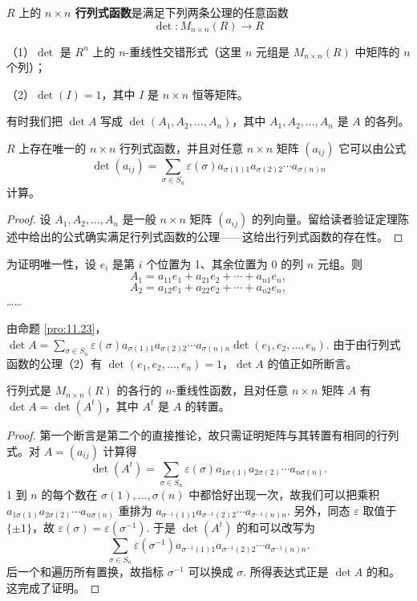 \begin{definition}
\(R\) 上的 \textbf{\(n \times n\) 行列式函数}是满足下列两条公理的任意函数
\[
\det : M_{n \times n}(R) \to R
\]

（1）\(\det\) 是 \(R^n\) 上的 \(n\)-重线性交错形式（这里 \(n\) 元组是 \(M_{n \times n}(R)\) 中矩阵的 \(n\) 个列）；

（2）\(\det(I) = 1\)，其中 \(I\) 是 \(n \times n\) 恒等矩阵。
\end{definition}

有时我们把 \(\det A\) 写成 \(\det(A_1, A_2, \ldots, A_n)\)，其中 \(A_1, A_2, \ldots, A_n\) 是 \(A\) 的各列。

\begin{theorem}\label{thm:11.24}
\(R\) 上存在唯一的 \(n \times n\) 行列式函数，并且对任意 \(n \times n\) 矩阵 \((a_{ij})\) 它可以由公式
\[
\det(a_{ij}) = \sum_{\sigma \in S_n} \varepsilon(\sigma)a_{\sigma(1)1}a_{\sigma(2)2}\cdots a_{\sigma(n)n}
\]
计算。
\end{theorem}

\begin{proof}
设 \(A_1, A_2, \ldots, A_n\) 是一般 \(n \times n\) 矩阵 \((a_{ij})\) 的列向量。留给读者验证定理陈述中给出的公式确实满足行列式函数的公理——这给出行列式函数的存在性。
\end{proof}

为证明唯一性，设 \(e_i\) 是第 \(i\) 个位置为 1、其余位置为 0 的列 \(n\) 元组。则
\[
A_1 = a_{11}e_1+a_{21}e_2+\cdots+a_{n1}e_n,
\]
\[
A_2 = a_{12}e_1+a_{22}e_2+\cdots+a_{n2}e_n,
\]
……

由命题 \ref{pro:11.23}，\(\det A = \sum_{\sigma \in S_n}\varepsilon(\sigma)a_{\sigma(1)1}a_{\sigma(2)2}\cdots a_{\sigma(n)n}\det(e_1, e_2, \ldots, e_n)\). 由于由行列式函数的公理（2）有 \(\det(e_1, e_2, \ldots, e_n) = 1\)，\(\det A\) 的值正如所断言。

\begin{corollary}\label{cor:11.25}
行列式是 \(M_{n \times n}(R)\) 的各行的 \(n\)-重线性函数，且对任意 \(n \times n\) 矩阵 \(A\) 有 \(\det A = \det(A^t)\)，其中 \(A^t\) 是 \(A\) 的转置。
\end{corollary}

\begin{proof}
第一个断言是第二个的直接推论，故只需证明矩阵与其转置有相同的行列式。对 \(A = (a_{ij})\) 计算得
\[
\det(A^t) = \sum_{\sigma \in S_n}\varepsilon(\sigma)a_{1\sigma(1)}a_{2\sigma(2)}\cdots a_{n\sigma(n)}.
\]
1 到 \(n\) 的每个数在 \(\sigma(1), \ldots, \sigma(n)\) 中都恰好出现一次，故我们可以把乘积 \(a_{1\sigma(1)}a_{2\sigma(2)}\cdots a_{n\sigma(n)}\) 重排为 \(a_{\sigma^{-1}(1)1}a_{\sigma^{-1}(2)2}\cdots a_{\sigma^{-1}(n)n}\). 另外，同态 \(\varepsilon\) 取值于 \(\{\pm 1\}\)，故 \(\varepsilon(\sigma) = \varepsilon(\sigma^{-1})\). 于是 \(\det(A^t)\) 的和可以改写为
\[
\sum_{\sigma \in S_n}\varepsilon(\sigma^{-1})a_{\sigma^{-1}(1)1}a_{\sigma^{-1}(2)2}\cdots a_{\sigma^{-1}(n)n}.
\]
后一个和遍历所有置换，故指标 \(\sigma^{-1}\) 可以换成 \(\sigma\). 所得表达式正是 \(\det A\) 的和。这完成了证明。
\end{proof}


